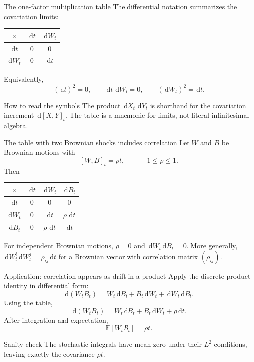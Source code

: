 \documentclass[handout,10pt,aspectratio=169]{beamer}
\newcommand{\E}{\mathbb E}
\newcommand{\dd}{\,\mathrm d}
\begin{document}
\begin{frame}{The one-factor multiplication table}
The differential notation summarizes the covariation limits:
\begin{center}
\renewcommand{\arraystretch}{1.55}
\begin{tabular}{c|cc}
\toprule
\(\times\) & \(\dd t\) & \(\dd W_t\) \\
\midrule
\(\dd t\) & \(0\) & \(0\) \\
\(\dd W_t\) & \(0\) & \(\dd t\) \\
\bottomrule
\end{tabular}
\end{center}
Equivalently,
\[
(\dd t)^2=0,
\qquad
\dd t\,\dd W_t=0,
\qquad
(\dd W_t)^2=\dd t.
\]
\begin{alertblock}{How to read the symbols}
The product \(\dd X_t\,\dd Y_t\) is shorthand for the covariation increment
\(\dd[X,Y]_t\). The table is a mnemonic for limits, not literal infinitesimal algebra.
\end{alertblock}
\end{frame}

\begin{frame}{The table with two Brownian shocks includes correlation}
Let \(W\) and \(B\) be Brownian motions with
\[
[W,B]_t=\rho t,
\qquad -1\le\rho\le1.
\]
Then
\begin{center}
\renewcommand{\arraystretch}{1.5}
\begin{tabular}{c|ccc}
\toprule
\(\times\) & \(\dd t\) & \(\dd W_t\) & \(\dd B_t\) \\
\midrule
\(\dd t\) & \(0\) & \(0\) & \(0\) \\
\(\dd W_t\) & \(0\) & \(\dd t\) & \(\rho\,\dd t\) \\
\(\dd B_t\) & \(0\) & \(\rho\,\dd t\) & \(\dd t\) \\
\bottomrule
\end{tabular}
\end{center}
For independent Brownian motions, \(\rho=0\) and \(\dd W_t\dd B_t=0\).
More generally, \(\dd W_t^i\dd W_t^j=\rho_{ij}\dd t\) for a Brownian vector with correlation matrix \((\rho_{ij})\).
\end{frame}

\begin{frame}{Application: correlation appears as drift in a product}
Apply the discrete product identity in differential form:
\[
\dd(W_tB_t)=W_t\dd B_t+B_t\dd W_t+\dd W_t\dd B_t.
\]
Using the table,
\[
\boxed{\dd(W_tB_t)=W_t\dd B_t+B_t\dd W_t+\rho\dd t.}
\]
After integration and expectation,
\[
\E[W_tB_t]=\rho t.
\]
\begin{block}{Sanity check}
The stochastic integrals have mean zero under their \(L^2\) conditions, leaving exactly the covariance \(\rho t\).
\end{block}
\end{frame}
\end{document}
